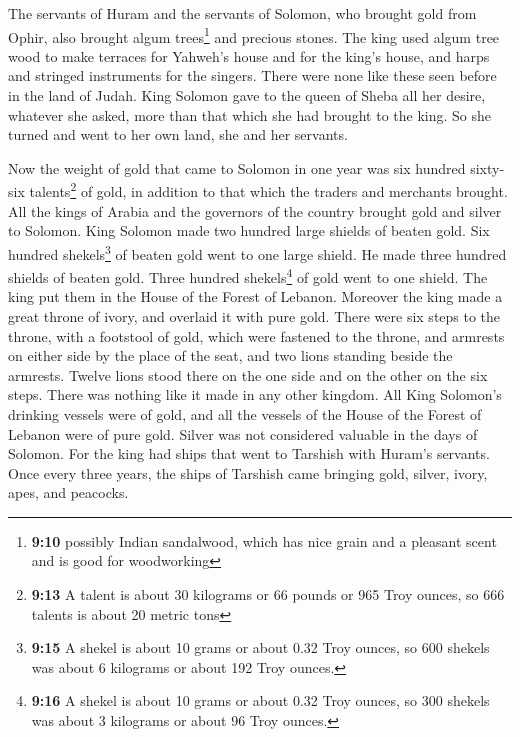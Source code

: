  The servants of Huram and the servants of Solomon, who
brought gold from Ophir, also brought algum trees\footnote{\textbf{9:10}
  possibly Indian sandalwood, which has nice grain and a pleasant scent
  and is good for woodworking} and precious stones.  The
king used algum tree wood to make terraces for Yahweh's house and for
the king's house, and harps and stringed instruments for the singers.
There were none like these seen before in the land of Judah.
 King Solomon gave to the queen of Sheba all her desire,
whatever she asked, more than that which she had brought to the king. So
she turned and went to her own land, she and her servants.

 Now the weight of gold that came to Solomon in one year
was six hundred sixty-six talents\footnote{\textbf{9:13} A talent is
  about 30 kilograms or 66 pounds or 965 Troy ounces, so 666 talents is
  about 20 metric tons} of gold,  in addition to that
which the traders and merchants brought. All the kings of Arabia and the
governors of the country brought gold and silver to Solomon.
 King Solomon made two hundred large shields of beaten
gold. Six hundred shekels\footnote{\textbf{9:15} A shekel is about 10
  grams or about 0.32 Troy ounces, so 600 shekels was about 6 kilograms
  or about 192 Troy ounces.} of beaten gold went to one large shield.
 He made three hundred shields of beaten gold. Three
hundred shekels\footnote{\textbf{9:16} A shekel is about 10 grams or
  about 0.32 Troy ounces, so 300 shekels was about 3 kilograms or about
  96 Troy ounces.} of gold went to one shield. The king put them in the
House of the Forest of Lebanon.  Moreover the king made a
great throne of ivory, and overlaid it with pure gold. 
There were six steps to the throne, with a footstool of gold, which were
fastened to the throne, and armrests on either side by the place of the
seat, and two lions standing beside the armrests.  Twelve
lions stood there on the one side and on the other on the six steps.
There was nothing like it made in any other kingdom.  All
King Solomon's drinking vessels were of gold, and all the vessels of the
House of the Forest of Lebanon were of pure gold. Silver was not
considered valuable in the days of Solomon.  For the king
had ships that went to Tarshish with Huram's servants. Once every three
years, the ships of Tarshish came bringing gold, silver, ivory, apes,
and peacocks.

